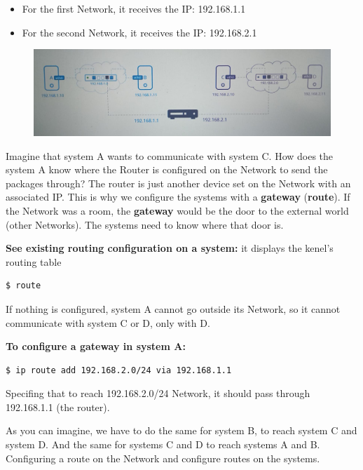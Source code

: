 \documentclass{article}
\newenvironment{codetemplate}[1][]{%
  \mybasecolorbox[#1]
  \itshape
}{%
  \endmybasecolorbox
}
\begin{document}
\begin{itemize}
    \item For the first Network, it receives the IP: 192.168.1.1
    \item For the second Network, it receives the IP: 192.168.2.1
\end{itemize}

\begin{figure}[H]
    \includegraphics[width=\textwidth]{pictures/ntw4.png}
\end{figure}

Imagine that system A wants to communicate with system C. How does the system 
A know where the Router is configured on the Network to send the packages through? 
The router is just another device set on the Network with an associated IP. This is why we configure the systems with a \textbf{gateway} (\textbf{route}). If the Network was a room, the \textbf{gateway} would be the door to the external world (other Networks). The systems need to know where that door is. 

\textbf{See existing routing configuration on a system:} it displays the kenel's routing table
\begin{codetemplate}{}
\begin{verbatim}
$ route
\end{verbatim}
\end{codetemplate}

If nothing is configured, system A cannot go outside its Network, so it cannot communicate with system C or D, only with D.

\textbf{To configure a gateway in system A:}
\begin{codetemplate}{}
\begin{verbatim}
$ ip route add 192.168.2.0/24 via 192.168.1.1
\end{verbatim}
\end{codetemplate}

Specifing that to reach 192.168.2.0/24 Network, it should pass through 192.168.1.1 (the router).

As you can imagine, we have to do the same for system B, to reach system C and system D. And the same for systems C and D to reach systems A and B. Configuring a route on the Network and configure routes on the systems.
\end{document}
